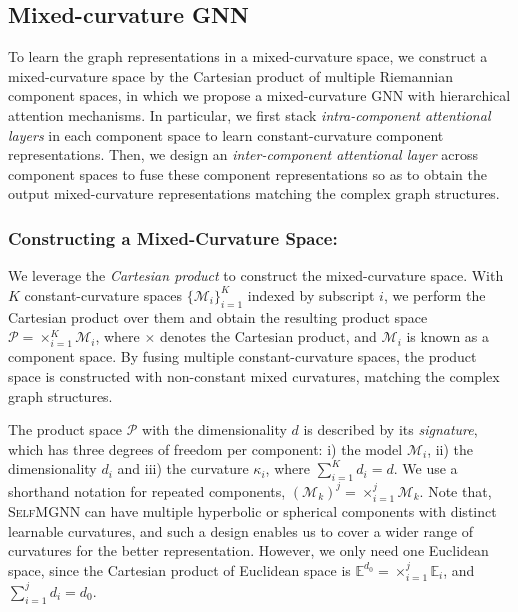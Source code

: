 \subsection{Mixed-curvature GNN}

To learn the graph representations in a mixed-curvature space,
we construct a mixed-curvature space by the Cartesian product of multiple Riemannian component spaces,
in which we propose a mixed-curvature GNN with hierarchical attention mechanisms.
In particular, we first stack \emph{intra-component attentional layers} in each component space to learn constant-curvature component representations.
Then, we design an \emph{inter-component attentional layer} across component spaces to fuse these component representations
 so as to obtain the output mixed-curvature representations matching the complex graph structures.

\subsubsection{Constructing a Mixed-Curvature Space:}
We leverage the \emph{Cartesian product} to construct the mixed-curvature space.
With $K$ constant-curvature spaces $\{\mathcal M_i\}_{i=1}^K$ indexed by subscript $i$, 
we perform the Cartesian product over them and obtain the resulting product space $\mathcal P = \times_{i=1}^K \mathcal M_i$,
where $\times$ denotes the Cartesian product, and $\mathcal M_i$ is  known as a component space.
By fusing multiple constant-curvature spaces, 
the product space is constructed with non-constant mixed curvatures, matching the complex graph structures.  

The product space $\mathcal P$ with the dimensionality $d$ is described by its \emph{signature}, which has three degrees of freedom per component: 
i) the model $\mathcal M_i$, 
ii) the dimensionality $d_i$  and 
iii) the curvature $\kappa_i$, where $\sum\nolimits_{i=1}^K d_i=d$.
We use a shorthand notation for repeated components, $(\mathcal M_k)^j=\times_{i=1}^j \mathcal M_k$.
Note that, \textsc{SelfMGNN} can have multiple hyperbolic or spherical components with distinct learnable curvatures, and such a design enables us to cover a wider range of curvatures for the better representation.
However, we only need one Euclidean space, since the Cartesian product of Euclidean space is $\mathbb E^{d_0}=\times_{i=1}^j \mathbb E_i$, 
and $\sum\nolimits_{i=1}^j d_i=d_0$.

